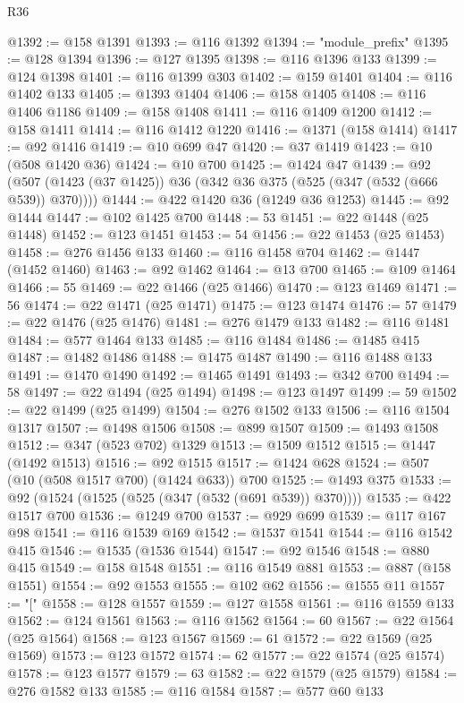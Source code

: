 \begin{lexlean}{R36}
\begin{coremodule}
@1392 := @158 @1391
@1393 := @116 @1392
@1394 := "module_prefix"
@1395 := @128 @1394
@1396 := @127 @1395
@1398 := @116 @1396 @133
@1399 := @124 @1398
@1401 := @116 @1399 @303
@1402 := @159 @1401
@1404 := @116 @1402 @133
@1405 := @1393 @1404
@1406 := @158 @1405
@1408 := @116 @1406 @1186
@1409 := @158 @1408
@1411 := @116 @1409 @1200
@1412 := @158 @1411
@1414 := @116 @1412 @1220
@1416 := @1371 (@158 @1414)
@1417 := @92 @1416
@1419 := @10 @699 @47
@1420 := @37 @1419
@1423 := @10 (@508 @1420 @36)
@1424 := @10 @700
@1425 := @1424 @47
@1439 := @92 (@507 (@1423 (@37 @1425)) @36 (@342 @36 @375 (@525 (@347 (@532 (@666 @539)) @370))))
@1444 := @422 @1420 @36 (@1249 @36 @1253)
@1445 := @92 @1444
@1447 := @102 @1425 @700
@1448 := 53
@1451 := @22 @1448 (@25 @1448)
@1452 := @123 @1451
@1453 := 54
@1456 := @22 @1453 (@25 @1453)
@1458 := @276 @1456 @133
@1460 := @116 @1458 @704
@1462 := @1447 (@1452 @1460)
@1463 := @92 @1462
@1464 := @13 @700
@1465 := @109 @1464
@1466 := 55
@1469 := @22 @1466 (@25 @1466)
@1470 := @123 @1469
@1471 := 56
@1474 := @22 @1471 (@25 @1471)
@1475 := @123 @1474
@1476 := 57
@1479 := @22 @1476 (@25 @1476)
@1481 := @276 @1479 @133
@1482 := @116 @1481
@1484 := @577 @1464 @133
@1485 := @116 @1484
@1486 := @1485 @415
@1487 := @1482 @1486
@1488 := @1475 @1487
@1490 := @116 @1488 @133
@1491 := @1470 @1490
@1492 := @1465 @1491
@1493 := @342 @700
@1494 := 58
@1497 := @22 @1494 (@25 @1494)
@1498 := @123 @1497
@1499 := 59
@1502 := @22 @1499 (@25 @1499)
@1504 := @276 @1502 @133
@1506 := @116 @1504 @1317
@1507 := @1498 @1506
@1508 := @899 @1507
@1509 := @1493 @1508
@1512 := @347 (@523 @702) @1329
@1513 := @1509 @1512
@1515 := @1447 (@1492 @1513)
@1516 := @92 @1515
@1517 := @1424 @628
@1524 := @507 (@10 (@508 @1517 @700) (@1424 @633)) @700
@1525 := @1493 @375
@1533 := @92 (@1524 (@1525 (@525 (@347 (@532 (@691 @539)) @370))))
@1535 := @422 @1517 @700
@1536 := @1249 @700
@1537 := @929 @699
@1539 := @117 @167 @98
@1541 := @116 @1539 @169
@1542 := @1537 @1541
@1544 := @116 @1542 @415
@1546 := @1535 (@1536 @1544)
@1547 := @92 @1546
@1548 := @880 @415
@1549 := @158 @1548
@1551 := @116 @1549 @881
@1553 := @887 (@158 @1551)
@1554 := @92 @1553
@1555 := @102 @62
@1556 := @1555 @11
@1557 := "["
@1558 := @128 @1557
@1559 := @127 @1558
@1561 := @116 @1559 @133
@1562 := @124 @1561
@1563 := @116 @1562
@1564 := 60
@1567 := @22 @1564 (@25 @1564)
@1568 := @123 @1567
@1569 := 61
@1572 := @22 @1569 (@25 @1569)
@1573 := @123 @1572
@1574 := 62
@1577 := @22 @1574 (@25 @1574)
@1578 := @123 @1577
@1579 := 63
@1582 := @22 @1579 (@25 @1579)
@1584 := @276 @1582 @133
@1585 := @116 @1584
@1587 := @577 @60 @133

\end{coremodule}
\end{lexlean}
